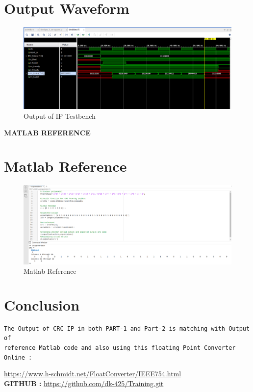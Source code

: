 \documentclass{article}
\begin{document}
\vspace{13cm}


\section{Output Waveform}
\vspace{1cm}
\begin{figure}[h]
    \centering
\includegraphics[width=\columnwidth]{figs/p2ipwav.png}
    \caption{Output of IP Testbench}
    \label{fig:my_label}
\end{figure}

\vspace{1cm}

\maketitle
\hfill \textbf{MATLAB REFERENCE}
\section{Matlab Reference}
\begin{figure}[h]
\centering
\includegraphics[width=1.1\textwidth]{figs/actual_matlab.png}
    \caption{Matlab Reference}
    \label{fig:my_label}
\end{figure}
\vspace{3cm}
\section{Conclusion}
\begin{lstlisting}
The Output of CRC IP in both PART-1 and Part-2 is matching with Output of 
reference Matlab code and also using this floating Point Converter Online :

\end{lstlisting}
\url{https://www.h-schmidt.net/FloatConverter/IEEE754.html}
\vspace{2cm}
\\
\textbf{GITHUB :} \url{https://github.com/dk-425/Training.git}
\end{document}
